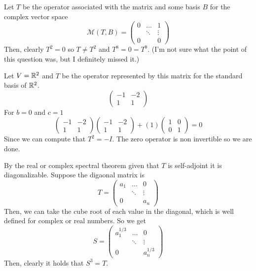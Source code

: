 \documentclass[10pt, twocolumn]{article}
\begin{document}
\begin{q}[8]
    Let $ T $ be the operator associated with the matrix and some basis $ B $ for the complex vector space 
    $$ \mathcal{M}(T, B) =\left(\begin{array}{ccc}0 & \dots & 1 \\ & \ddots & \vdots \\ 0 & & 0\end{array}\right) $$
    Then, clearly $ T^2 = 0 $ so $ T \neq T^2 $ and $ T^8 = 0 = T^9 $.
    (I'm not sure what the point of this question was, but I definitely missed it.)
\end{q}

\begin{q}[10]
    Let $ V = \mathbb{R}^2 $ and $ T $ be the operator represented by this matrix for the standard basis of $ \mathbb{R}^2 $. 
    $$ \left(\begin{array}{cc}
        -1 & -2 \\
        1 & 1 
    \end{array} \right) $$
    For $ b = 0 $ and $ c = 1 $
    $$ \left(\begin{array}{cc}
        -1 & -2 \\
        1 & 1 
    \end{array} \right) 
    \left(\begin{array}{cc}
        -1 & -2 \\
        1 & 1 
    \end{array} \right)
    + (1) 
    \left(\begin{array}{cc}
        1 & 0 \\
        0 & 1 
    \end{array} \right)
    =
    0
    $$
    Since we can compute that $ T^2 = -I $. The zero operator is non invertible so we are done.
\end{q}

\begin{q}[11]
    By the real or complex spectral theorem given that $ T $ is self-adjoint it is diagonalizable. 
    Suppose the digaonal matrix is  
    $$ T = 
        \left(\begin{array}{ccc}a_1 & \dots & 0 \\ & \ddots & \vdots \\ 0 & & a_n\end{array}\right)
    $$
    Then, we can take the cube root of each value in the diagonal, which is well defined for complex or real numbers.
    So we get 
    $$ S = 
        \left(\begin{array}{ccc} a_1^{1/3} & \dots & 0 \\ & \ddots & \vdots \\ 0 & & a_n^{1/3}\end{array}\right)
    $$
    Then, clearly it holds that $ S^3 = T $.
\end{q}
\end{document}
